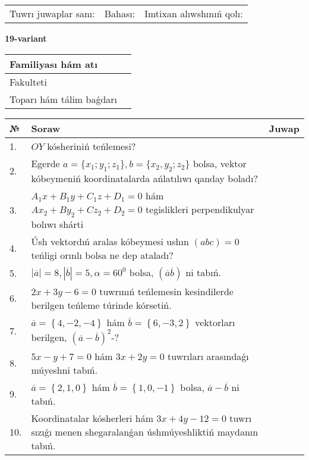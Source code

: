 \documentclass{article}
\begin{document}
\vspace{1cm}

\begin{tabular}{lll}
Tuwrı juwaplar sanı: \underline{\hspace{1.5cm}} & 
Bahası: \underline{\hspace{1.5cm}} & 
Imtixan alıwshınıń qolı: \underline{\hspace{2cm}} \\
\end{tabular}

\egroup

\newpage


\textbf{19-variant}\\

\bgroup
\def\arraystretch{1.6} %

\begin{tabular}{|m{5.7cm}|m{9.5cm}|}
\hline
Familiyası hám atı & \\
\hline
Fakulteti  & \\
\hline
Toparı hám tálim baǵdarı  & \\
\hline
\end{tabular}

\vspace{1cm}

\begin{tabular}{|m{0.7cm}|m{10cm}|m{4cm}|}
\hline
№ & Soraw & Juwap \\
\hline
1. & $OY$ kósheriniń teńlemesi? &  \\
\hline
2. & Egerde $a=\{ x_1; y_1; z_1\}, b=\{ x_2, y_2; z_2\}$ bolsa, vektor kóbeymeniń koordinatalarda ańlatılıwı qanday boladı? &  \\
\hline
3. & $A_1x+B_1y+C_1z+D_1=0$ hám $Ax_2+By_2+Cz_2+D_2=0$ tegislikleri perpendikulyar bolıwı shárti &  \\
\hline
4. & Úsh vektordıń aralas kóbeymesi ushın $(abc)=0$ teńligi orınlı bolsa ne dep ataladı? &  \\
\hline
5. & $\left| \overline{a} \right|=8, \left| \overline{b} \right|=5, \alpha=60^{0}$ bolsa, $( \overline{a}\overline{b} )$ ni tabıń. &  \\
\hline
6. & $2x+3y-6=0$ tuwrınıń teńlemesin kesindilerde berilgen teńleme túrinde kórsetiń. &  \\
\hline
7. & $\overline{a}=\left\{ 4,-2,-4 \right\}$ hám $\overline{b}=\left\{ 6,-3, 2 \right\}$ vektorları berilgen, $(\overline{a}-\overline{b}) ^{2}$-? &  \\
\hline
8. & $5x-y+7=0$ hám $3x+2y=0$ tuwrıları arasındaǵı múyeshni tabıń. &  \\
\hline
9. & $\overline{a}=\left\{ 2, 1, 0 \right\}$ hám $\overline{b}=\left\{ 1, 0,-1 \right\}$ bolsa, $\overline{a}-\overline{b}$ ni tabıń. &  \\
\hline
10. & Koordinatalar kósherleri hám $ 3x+4y-12=0 $ tuwrı sızıǵı menen shegaralanǵan úshmúyeshliktiń maydanın tabıń. &  \\
\hline
\end{tabular}
\end{document}
